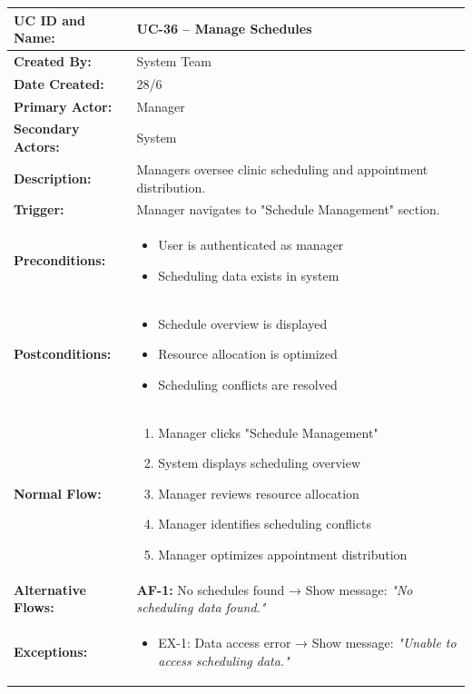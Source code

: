 \documentclass[12pt,a4paper]{article}
\begin{document}
\renewcommand{\arraystretch}{1.5}
\begin{longtable}{|p{4.5cm}|p{10.5cm}|}
\hline
\textbf{UC ID and Name:} & UC-36 – Manage Schedules \\
\hline
\textbf{Created By:} & System Team \\
\hline
\textbf{Date Created:} & 28/6 \\
\hline
\textbf{Primary Actor:} & Manager \\
\hline
\textbf{Secondary Actors:} & System \\
\hline
\textbf{Description:} & Managers oversee clinic scheduling and appointment distribution. \\
\hline
\textbf{Trigger:} & Manager navigates to "Schedule Management" section. \\
\hline
\textbf{Preconditions:} &
\begin{itemize}
  \item User is authenticated as manager
  \item Scheduling data exists in system
\end{itemize} \\
\hline
\textbf{Postconditions:} &
\begin{itemize}
  \item Schedule overview is displayed
  \item Resource allocation is optimized
  \item Scheduling conflicts are resolved
\end{itemize} \\
\hline
\textbf{Normal Flow:} &
\begin{enumerate}
  \item Manager clicks "Schedule Management"
  \item System displays scheduling overview
  \item Manager reviews resource allocation
  \item Manager identifies scheduling conflicts
  \item Manager optimizes appointment distribution
\end{enumerate} \\
\hline
\textbf{Alternative Flows:} &
\textbf{AF-1:} No schedules found → Show message: \textit{"No scheduling data found."} \\
\hline
\textbf{Exceptions:} &
\begin{itemize}
  \item EX-1: Data access error → Show message: \textit{"Unable to access scheduling data."}
\end{itemize} \\

\end{longtable}
\end{document}
